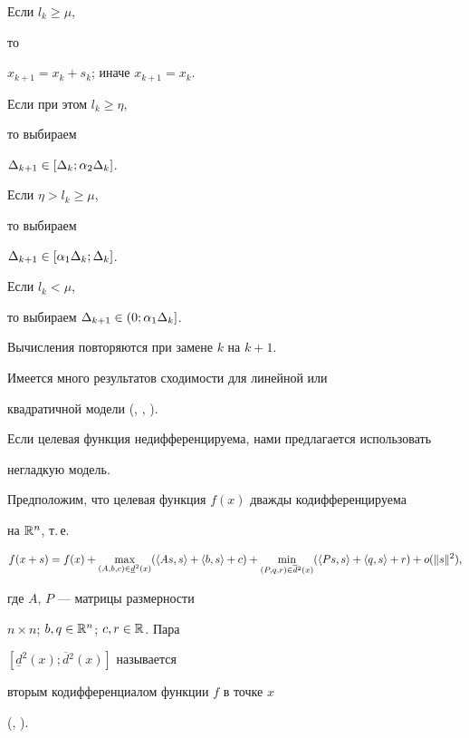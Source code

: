 Если $l_k \geq \mu$,


то


$x_{k+1}=x_k+s_k$; иначе $x_{k+1}=x_k$.





Если при этом $l_k\geq \eta$,


то выбираем


$\Delta_{k+1} \in [\Delta_k; \alpha_2 \Delta_k]$.





Если $\eta >l_k\geq \mu$,


то выбираем


$\Delta_{k+1} \in [\alpha_1 \Delta_k; \Delta_k]$.





Если $l_k< \mu$,


то выбираем $\Delta_{k+1} \in (0; \alpha_1 \Delta_k]$.


Вычисления повторяются при замене $k$ на $k+1$.





Имеется много результатов сходимости для линейной или


квадратичной модели (\cite{more}, \cite{powell}, \cite{sore}).


Если целевая функция недифференцируема, нами предлагается использовать 


негладкую модель.





Предположим, что целевая функция $f(x)$ дважды кодифференцируема


на $\Bbb R^n$, т.\,е.


$$


f(x+s) = f(x) + \max_{(A,b,c) \in


\underline{d}^2 (x)} ( \la As,s\ra + \la b,s\ra + c) + \min_{(P,q,r) \in


\overline{d}{}^2 (x)} (\la Ps,s\ra+ \la q,s\ra + r) + o(\|s\|^2),


$$


где $A$, $P$ --- матрицы размерности


$n \times n$; $b,q \in \Bbb R^n$; $c,r \in \Bbb R$. Пара


$[ \underline{d}^2 (x); \overline{d}{}^2 (x)]$ называется


вторым кодифференциалом функции $f$ в точке $x$


(\cite{demrub}, \cite{demrub2}).





